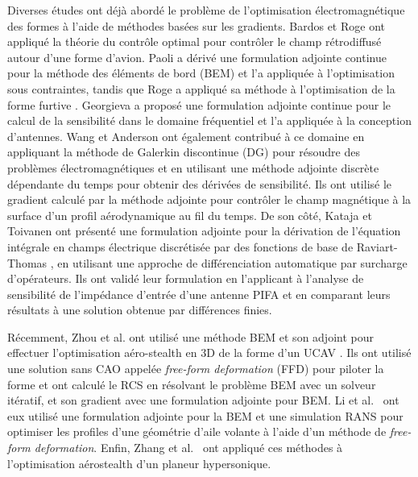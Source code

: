 Diverses études ont déjà abordé le problème de l'optimisation électromagnétique des formes à l'aide de méthodes basées sur les gradients. Bardos et Roge \citep{Bardos1995} ont appliqué la théorie du contrôle optimal \citep{Lions1968} pour contrôler le champ rétrodiffusé autour d'une forme d'avion. Paoli \citep{Paoli2001} a dérivé une formulation adjointe continue pour la méthode des éléments de bord (BEM) et l'a appliquée à l'optimisation sous contraintes, tandis que Roge a appliqué sa méthode à l'optimisation de la forme furtive \citep{Roge2003}. Georgieva \citep{Georgieva2002,Nikolova2004} a proposé une formulation adjointe continue pour le calcul de la sensibilité dans le domaine fréquentiel et l'a appliquée à la conception d'antennes. Wang et Anderson \citep{Wang2011} ont également contribué à ce domaine en appliquant la méthode de Galerkin discontinue (DG) pour résoudre des problèmes électromagnétiques et en utilisant une méthode adjointe discrète dépendante du temps pour obtenir des dérivées de sensibilité. Ils ont utilisé le gradient calculé par la méthode adjointe pour contrôler le champ magnétique à la surface d'un profil aérodynamique au fil du temps. De son côté, Kataja et Toivanen ont présenté une formulation adjointe pour la dérivation de l'équation intégrale en champs électrique discrétisée par des fonctions de base de Raviart-Thomas \citep{Kataja2013}, en utilisant une approche de différenciation automatique par surcharge d'opérateurs. Ils ont validé leur formulation en l'applicant à l'analyse de sensibilité de l'impédance d'entrée d'une antenne PIFA et en comparant leurs résultats à une solution obtenue par différences finies.

Récemment, Zhou et al. ont utilisé une méthode BEM et son adjoint pour effectuer l'optimisation aéro-stealth en 3D de la forme d'un UCAV \citep{Zhou2019, Zhou2020}. Ils ont utilisé une solution sans CAO appelée \textit{free-form deformation} (FFD) pour piloter la forme et ont calculé le RCS en résolvant le problème BEM avec un solveur itératif, et son gradient avec une formulation adjointe pour BEM. Li et al.~\citep{Li2021} ont eux utilisé une formulation adjointe pour la BEM et une simulation RANS pour optimiser les profiles d'une géométrie d'aile volante à l'aide d'un méthode de \textit{free-form deformation}. Enfin, Zhang et al.~\citep{Zhang2025} ont appliqué ces méthodes à l'optimisation aérostealth d'un planeur hypersonique.

